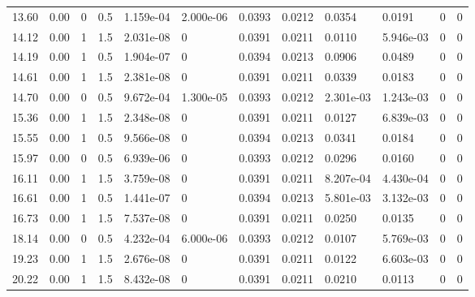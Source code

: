 \documentclass[preview]{standalone}
\begin{document}
{{\begin{tabular}{L{1.2cm}C{1.2cm} C{0.3cm}C{0.5cm} C{1.4cm}C{1.4cm} C{1.4cm}C{1.4cm} C{1.6cm}C{1.6cm} C{1.6cm}C{1.6cm}}
  13.60  &  0.00  & 0     & 0.5 &  1.159e-04  & 2.000e-06  &  0.0393&   0.0212& 0.0354 & 0.0191   &  0 & 0  \\ 
  14.12  &  0.00  & 1     & 1.5 &  2.031e-08  & 0  &  0.0391&   0.0211& 0.0110 & 5.946e-03   &  0 & 0  \\ 
  14.19  &  0.00  & 1     & 0.5 &  1.904e-07  & 0  &  0.0394&   0.0213& 0.0906 & 0.0489   &  0 & 0  \\ 
  14.61  &  0.00  & 1     & 1.5 &  2.381e-08  & 0  &  0.0391&   0.0211& 0.0339 & 0.0183   &  0 & 0  \\ 
  14.70  &  0.00  & 0     & 0.5 &  9.672e-04  & 1.300e-05  &  0.0393&   0.0212& 2.301e-03 & 1.243e-03   &  0 & 0  \\ 
  15.36  &  0.00  & 1     & 1.5 &  2.348e-08  & 0  &  0.0391&   0.0211& 0.0127 & 6.839e-03   &  0 & 0  \\ 
  15.55  &  0.00  & 1     & 0.5 &  9.566e-08  & 0  &  0.0394&   0.0213& 0.0341 & 0.0184   &  0 & 0  \\ 
  15.97  &  0.00  & 0     & 0.5 &  6.939e-06  & 0  &  0.0393&   0.0212& 0.0296 & 0.0160   &  0 & 0  \\ 
  16.11  &  0.00  & 1     & 1.5 &  3.759e-08  & 0  &  0.0391&   0.0211& 8.207e-04 & 4.430e-04   &  0 & 0  \\ 
  16.61  &  0.00  & 1     & 0.5 &  1.441e-07  & 0  &  0.0394&   0.0213& 5.801e-03 & 3.132e-03   &  0 & 0  \\ 
  16.73  &  0.00  & 1     & 1.5 &  7.537e-08  & 0  &  0.0391&   0.0211& 0.0250 & 0.0135   &  0 & 0  \\ 
  18.14  &  0.00  & 0     & 0.5 &  4.232e-04  & 6.000e-06  &  0.0393&   0.0212& 0.0107 & 5.769e-03   &  0 & 0  \\ 
  19.23  &  0.00  & 1     & 1.5 &  2.676e-08  & 0  &  0.0391&   0.0211& 0.0122 & 6.603e-03   &  0 & 0  \\ 
  20.22  &  0.00  & 1     & 1.5 &  8.432e-08  & 0  &  0.0391&   0.0211& 0.0210 & 0.0113   &  0 & 0  \\ 
\hline 
\end{tabular} 

}}
\end{document}
